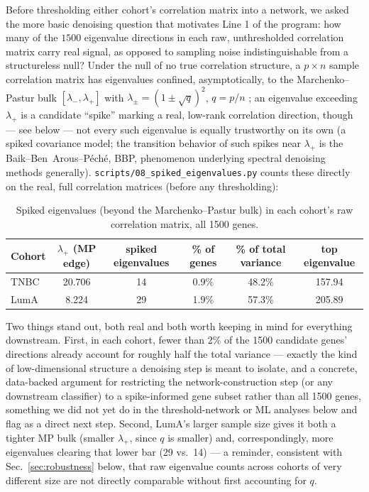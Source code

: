 \documentclass[11pt]{article}
\begin{document}
Before thresholding either cohort's correlation matrix into a network,
we asked the more basic denoising question that motivates Line 1 of the
program: how many of the $1500$ eigenvalue directions in each raw,
unthresholded correlation matrix carry real signal, as opposed to
sampling noise indistinguishable from a structureless null? Under the
null of no true correlation structure, a $p\times n$ sample correlation
matrix has eigenvalues confined, asymptotically, to the
Marchenko--Pastur bulk $[\lambda_-,\lambda_+]$ with
$\lambda_\pm=(1\pm\sqrt{q})^2$, $q=p/n$ \citep{marchenkopastur1967}; an
eigenvalue exceeding $\lambda_+$ is a candidate ``spike'' marking a
real, low-rank correlation direction, though --- see below --- not
every such eigenvalue is equally trustworthy on its own (a spiked
covariance model; the transition behavior of such spikes near
$\lambda_+$ is the Baik--Ben~Arous--P\'ech\'e, BBP, phenomenon
underlying spectral denoising methods generally).
\texttt{scripts/08\_spiked\_eigenvalues.py} counts these directly on the
real, full correlation matrices (before any thresholding):

\begin{table}[h]
\centering
\caption{Spiked eigenvalues (beyond the Marchenko--Pastur bulk) in each
cohort's raw correlation matrix, all 1500 genes.}
\label{tab:spiked}
\begin{tabular}{lccccc}
\toprule
Cohort & $\lambda_+$ (MP edge) & spiked eigenvalues & \% of genes & \% of total variance & top eigenvalue \\
\midrule
TNBC & 20.706 & 14 & 0.9\% & 48.2\% & 157.94 \\
LumA & 8.224 & 29 & 1.9\% & 57.3\% & 205.89 \\
\bottomrule
\end{tabular}
\end{table}

Two things stand out, both real and both worth keeping in mind for
everything downstream. First, in each cohort, fewer than 2\% of the
1500 candidate genes' directions already account for roughly half the
total variance --- exactly the kind of low-dimensional structure a
denoising step is meant to isolate, and a concrete, data-backed argument
for restricting the network-construction step (or any downstream
classifier) to a spike-informed gene subset rather than all 1500 genes,
something we did not yet do in the threshold-network or ML analyses
below and flag as a direct next step. Second, LumA's larger sample size
gives it both a tighter MP bulk (smaller $\lambda_+$, since $q$ is
smaller) and, correspondingly, more eigenvalues clearing that lower bar
(29 vs.\ 14) --- a reminder, consistent with
Sec.~\ref{sec:robustness} below, that raw eigenvalue counts across
cohorts of very different size are not directly comparable without
first accounting for $q$.
\end{document}
